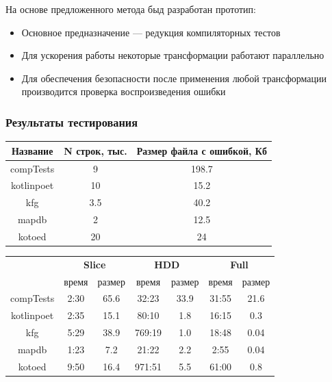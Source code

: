\begin{frame}[fragile]
	На основе предложенного метода быд разработан прототип:
		\begin{itemize}
			\item Основное предназначение --- редукция компиляторных тестов
			\item Для ускорения работы некоторые трансформации работают параллельно
			\item Для обеспечения безопасности после применения любой трансформации производится проверка воспроизведения ошибки
		\end{itemize}
\end{frame}

\begin{frame}[fragile]
	\frametitle{Результаты тестирования}
\begin{table}[]
\center
\footnotesize
\begin{tabular}{| c | c | c |}
\hline
\bf Название & \bf N строк, тыс. & \bf Размер файла с ошибкой, Кб \\
\hline
compTests & 9 & 198.7\\
\hline
kotlinpoet & 10 & 15.2\\
\hline
kfg & 3.5 & 40.2\\
\hline
mapdb & 2 & 12.5\\
\hline
kotoed & 20 & 24\\
\hline
\end{tabular}
\end{table}

\begin{table}[]
\footnotesize
\begin{tabular}{| c | c | c | c | c | c | c |}
\hline
\bf \multirow{2}{*}{Проект} & \multicolumn{2}{|c|}{\bf Slice} & \multicolumn{2}{|c|}{\bf HDD} & \multicolumn{2}{|c|}{\bf Full} \\
\cline{2-7}
& время & размер & время & размер & время & размер \\
\hline
compTests & 2:30 & 65.6 & 32:23 & 33.9 & 31:55 & 21.6 \\
\hline
kotlinpoet & 2:35 & 15.1 & 80:10 & 1.8 & 16:15 & 0.3 \\
\hline
kfg & 5:29 & 38.9 & 769:19 & 1.0 & 18:48 & 0.04 \\
\hline
mapdb & 1:23 & 7.2 & 21:22 & 2.2 & 2:55 & 0.04 \\
\hline
kotoed & 9:50 & 16.4 & 971:51 & 5.5 & 61:00 & 0.8 \\
\hline
\end{tabular}
\end{table}
\end{frame}


